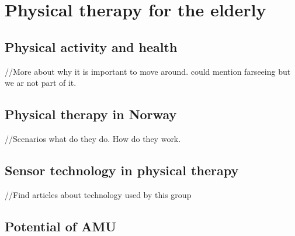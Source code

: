 \chapter{Physical therapy for the elderly}

\section{Physical activity and health}
//More about why it is important to move around. could mention farseeing but we ar not part of it.

\section{Physical therapy in Norway}
//Scenarios what do they do. How do they work.

\section{Sensor technology in physical therapy}
//Find articles about technology used by this group

\section{Potential of AMU}
